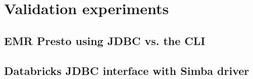 \section{Validation experiments}\label{validationExperiments}

\subsection{EMR Presto using JDBC vs. the CLI}\label{prestoJDBvsCLI}

\subsection{Databricks JDBC interface with Simba driver}\label{databricksJDBC}
